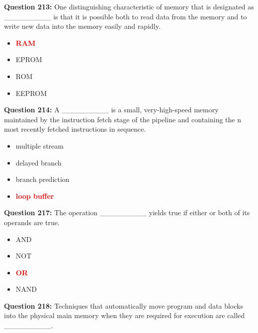 \documentclass[12pt,a4paper]{article}
\begin{document}
\vspace{0.5cm}

\textbf{Question 213:} One distinguishing characteristic of memory that is designated as _________ is that it is possible both to read data from the memory and to write new data into the memory easily and rapidly.

\begin{itemize}
    \item[\textbf{A.}] \textcolor{red}{\textbf{RAM}}
    \item[\textbf{B.}] EPROM
    \item[\textbf{C.}] ROM
    \item[\textbf{D.}] EEPROM
\end{itemize}

\vspace{0.5cm}

\textbf{Question 214:} A _________ is a small, very-high-speed memory maintained by the instruction fetch stage of the pipeline and containing the n most recently fetched instructions in sequence.

\begin{itemize}
    \item[\textbf{A.}] multiple stream
    \item[\textbf{B.}] delayed branch
    \item[\textbf{C.}] branch prediction
    \item[\textbf{D.}] \textcolor{red}{\textbf{loop buffer}}
\end{itemize}

\vspace{0.5cm}

\textbf{Question 217:} The operation _________ yields true if either or both of its operands are true.

\begin{itemize}
    \item[\textbf{A.}] AND
    \item[\textbf{B.}] NOT
    \item[\textbf{C.}] \textcolor{red}{\textbf{OR}}
    \item[\textbf{D.}] NAND
\end{itemize}

\vspace{0.5cm}

\textbf{Question 218:} Techniques that automatically move program and data blocks into the physical main memory when they are required for execution are called _________.
\end{document}
